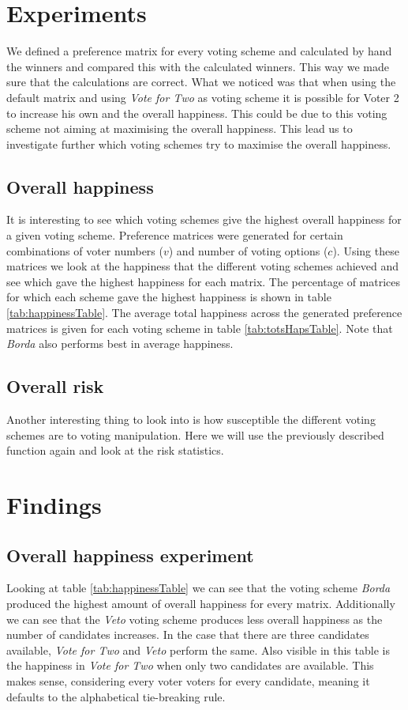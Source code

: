 \section{Experiments}
We defined a preference matrix for every voting scheme and calculated by hand the winners and compared this with the calculated winners. This way we made sure that the calculations are correct. 
What we noticed was that when using the default matrix and using \textit{Vote for Two} as voting scheme it is possible for Voter 2 to increase his own and the overall happiness. This could be due to this voting scheme not aiming at maximising the overall happiness. This lead us to investigate further which voting schemes try to maximise the overall happiness.

\subsection{Overall happiness}
It is interesting to see which voting schemes give the highest overall happiness for a given voting scheme. Preference matrices were generated for certain combinations of voter numbers ($v$) and number of voting options ($c$). Using these matrices we look at the happiness that the different voting schemes achieved and see which gave the highest happiness for each matrix. The percentage of matrices for which each scheme gave the highest happiness is shown in table \ref{tab:happinessTable}. The average total happiness across the generated preference matrices is given for each voting scheme in table \ref{tab:totsHapsTable}. Note that \textit{Borda} also performs best in average happiness.

\subsection{Overall risk}
Another interesting thing to look into is how susceptible the different voting schemes are to voting manipulation. Here we will use the previously described function again and look at the risk statistics.

\section{Findings}

\subsection{Overall happiness experiment}
Looking at table \ref{tab:happinessTable} we can see that the voting scheme \textit{Borda} produced the highest amount of overall happiness for every matrix. Additionally we can see that the \textit{Veto} voting scheme produces less overall happiness as the number of candidates increases. In the case that there are three candidates available, \textit{Vote for Two} and \textit{Veto} perform the same. Also visible in this table is the happiness in \textit{Vote for Two} when only two candidates are available. This makes sense, considering every voter voters for every candidate, meaning it defaults to the alphabetical tie-breaking rule.

